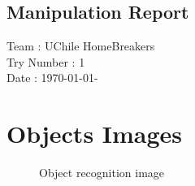 \documentclass[letterpaper,11pt,english]{article}
\begin{document}
\begin{center}
	\section*{Manipulation Report}

	Team : UChile HomeBreakers \\
	Try Number : 1 \\
	Date : \today - \currenttime%

\end{center}



\section*{Objects Images}


\begin{figure}[H]
	\centering
	\caption{Object recognition image}
\end{figure}



\end{document}
